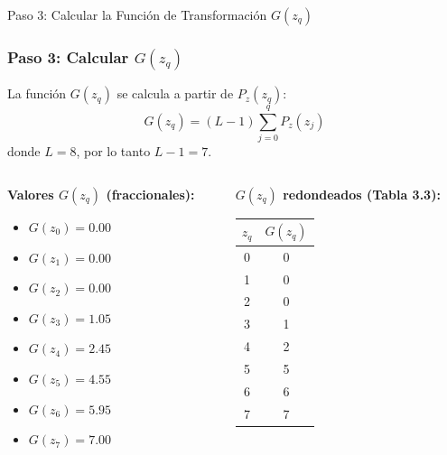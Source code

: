 \documentclass{beamer}
\begin{document}
\begin{frame}{Paso 3: Calcular la Función de Transformación $G(z_q)$}
\frametitle{Paso 3: Calcular $G(z_q)$} %
  La función $G(z_q)$ se calcula a partir de $P_z(z_q)$:
  \begin{equation}
    G(z_q) = (L-1) \sum_{j=0}^{q} P_z(z_j) \label{eq:Gzq_calc}
  \end{equation}
  donde $L=8$, por lo tanto $L-1=7$.

  \begin{columns}[T,onlytextwidth] %
    \begin{column}{0.5\textwidth}
      \footnotesize %
      \textbf{Valores $G(z_q)$ (fraccionales):}
      \begin{itemize}
        \item $G(z_0) = 0.00$
        \item $G(z_1) = 0.00$
        \item $G(z_2) = 0.00$
        \item $G(z_3) = 1.05$
        \item $G(z_4) = 2.45$
        \item $G(z_5) = 4.55$
        \item $G(z_6) = 5.95$
        \item $G(z_7) = 7.00$
      \end{itemize}
    \end{column}
    \begin{column}{0.5\textwidth}
      \footnotesize %
      \textbf{$G(z_q)$ redondeados (Tabla 3.3):}
        \centering %
        \begin{tabular}{cc}
            \toprule
            $z_q$ & $G(z_q)$ \\
            \midrule
            0 & 0 \\
            1 & 0 \\
            2 & 0 \\
            3 & 1 \\
            4 & 2 \\
            5 & 5 \\
            6 & 6 \\
            7 & 7 \\
            \bottomrule
        \end{tabular}
    \end{column}
  \end{columns}
\end{frame}
\end{document}
